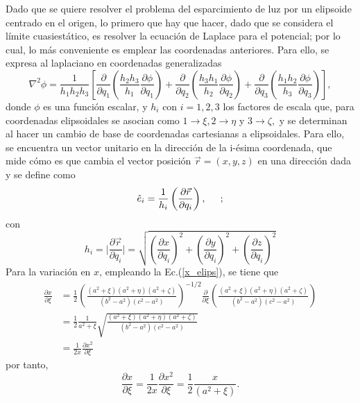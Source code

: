 Dado que se quiere resolver el problema del esparcimiento de luz por un elipsoide centrado en el origen, lo primero que hay que hacer, dado que se considera el límite cuasiestático, es resolver la ecuación de Laplace para el potencial; por lo cual, lo más conveniente es emplear las coordenadas anteriores. Para ello, se expresa al laplaciano en coordenadas generalizadas \cite{Arfken}
\begin{equation}
	\nabla^2\phi=\frac{1}{h_1h_2h_3}\left[\frac{\partial}{\partial q_1}\left(\frac{h_2h_3}{h_1}\frac{\partial\phi}{\partial q_1}\right)+\frac{\partial}{\partial q_2}\left(\frac{h_3h_1}{h_2}\frac{\partial\phi}{\partial q_2}\right)+\frac{\partial}{\partial q_3}\left(\frac{h_1h_2}{h_3}\frac{\partial\phi}{\partial q_3}\right)\right],
	\label{laplaciano}    
\end{equation}
donde $\phi$ es una función escalar, y  $h_i$ con $i=1,2,3$ los factores de escala que, para coordenadas elipsoidales se asocian como $1\rightarrow\xi, 2\rightarrow\eta$ y $3\rightarrow\zeta,$ y se determinan al hacer un cambio de base de coordenadas cartesianas a elipsoidales. Para ello, se encuentra un vector unitario en la dirección de la i-ésima coordenada, que mide cómo es que cambia el vector posición $\vec{r}=(x,y,z)$ en una dirección dada y se define como \cite{Arfken}
\begin{equation}
	\hat{e}_{i}=\frac{1}{h_i}\left(\frac{\partial \Vec{r}}{\partial q_i}\right), \hspace{0.5cm} ;    
\end{equation}
con
\begin{equation}
	h_i=\Big|\frac{\partial \Vec{r}}{\partial q_i}\Big|=\sqrt{\left(\frac{\partial x}{\partial q_i}\right)^2+\left(\frac{\partial y}{\partial q_i}\right)^2+\left(\frac{\partial z}{\partial q_i}\right)^2}
\end{equation} 
Para la variación en $x$, empleando la Ec.(\ref{x_elips}), se tiene que \begin{align*}
	\frac{\partial x}{\partial \xi}&=\frac{1}{2}\left(\frac{(a^2+\xi)(a^2+\eta)(a^2+\zeta)}{(b^2-a^2)(c^2-a^2)}\right)^{-1/2}\frac{\partial}{\partial \xi}\left(\frac{(a^2+\xi)(a^2+\eta)(a^2+\zeta)}{(b^2-a^2)(c^2-a^2)}\right)\nonumber\\
	&=\frac{1}{2}\frac{1}{a^2+\xi}\sqrt{\frac{(a^2+\xi)(a^2+\eta)(a^2+\zeta)}{(b^2-a^2)(c^2-a^2)}}\nonumber\\
	&=\frac{1}{2x}\frac{\partial x^2}{\partial\xi}
\end{align*}
por tanto,
\begin{equation*}
	\frac{\partial x}{\partial \xi}=\frac{1}{2x}\frac{\partial x^2}{\partial\xi}=\frac{1}{2}\frac{x}{(a^2+\xi)}.
\end{equation*}
